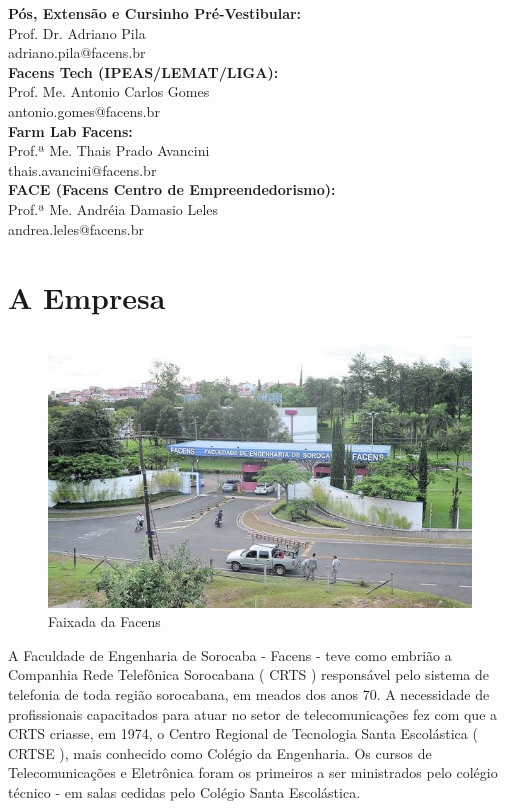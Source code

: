 \documentclass[
	12pt,				%
	oneside,			%
	a4paper,			%
	chapter=TITLE,		%
	section=TITLE,		%
	sumario=tradicional %
	english,			%
	french,				%
	spanish,			%
	brazil				%
	]{abntex2}
\begin{document}
\textbf{Pós, Extensão e Cursinho Pré-Vestibular:} \\ \indent Prof. Dr. Adriano Pila \\
\indent adriano.pila@facens.br \\

\textbf{Facens Tech (IPEAS/LEMAT/LIGA):} \\ \indent Prof. Me. Antonio Carlos Gomes \\
\indent antonio.gomes@facens.br \\

\textbf{Farm Lab Facens:} \\ \indent Prof.ª Me. Thais Prado Avancini \\
\indent thais.avancini@facens.br \\

\textbf{FACE (Facens Centro de Empreendedorismo):} \\ \indent Prof.ª Me. Andréia Damasio Leles \\
\indent andrea.leles@facens.br

\section{A Empresa}
\label{sec:aempresa}
\begin{figure}[htb]
	\caption{\label{fig:mapsfacens} Faixada da Facens}
	\begin{center}
		\includegraphics[scale=0.85]{facensfachada}
	\end{center}
\end{figure}

A Faculdade de Engenharia de Sorocaba - Facens - teve como embrião a Companhia Rede Telefônica Sorocabana ( CRTS ) responsável pelo sistema de telefonia de toda região sorocabana, em meados dos anos 70. A necessidade de profissionais capacitados para atuar no setor de telecomunicações fez com que a CRTS criasse, em 1974, o Centro Regional de Tecnologia Santa Escolástica ( CRTSE ), mais conhecido como Colégio da Engenharia. Os cursos de Telecomunicações e Eletrônica foram os primeiros a ser ministrados pelo colégio técnico - em salas cedidas pelo Colégio Santa Escolástica.
\end{document}
